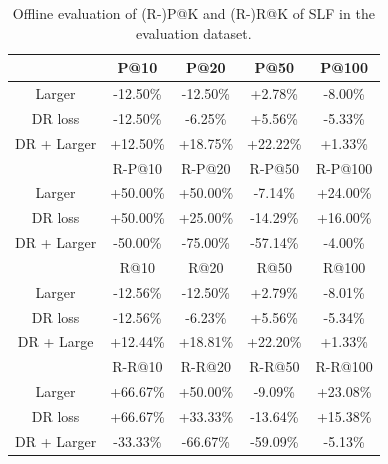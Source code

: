 \documentclass[sigconf, authorversion]{acmart}
\begin{document}
\begin{table}[h]
  \caption{Offline evaluation of (R-)P@K and (R-)R@K of SLF in the evaluation dataset.}
  \label{tab:offline_eval_TPLF}
  \begin{tabular}{ccccc}
    \toprule
    & P@10 & P@20 & P@50 & P@100  \\
    \hline
    Larger      & -12.50\% & -12.50\% & +2.78\%  & -8.00\% \\
    DR loss   & -12.50\%   & -6.25\%    & +5.56\%    & -5.33\%     \\
    DR + Larger      & +12.50\% & +18.75\% & +22.22\% & +1.33\% \\
    \hline \hline
    & R-P@10 & R-P@20 & R-P@50 & R-P@100  \\
    \hline
    Larger      & +50.00\% & +50.00\%  & -7.14\%  & +24.00\% \\
    DR loss   & +50.00\%   & +25.00\%   & -14.29\%   & +16.00\%    \\
    DR + Larger      & -50.00\% & -75.00\%  & -57.14\% & -4.00\% \\
    \hline \hline
    & R@10 & R@20 & R@50 & R@100  \\
    \hline
    Larger   & -12.56\%    & -12.50\%   & +2.79\%     & -8.01\%     \\
    DR loss   & -12.56\%    & -6.23\%    & +5.56\%     & -5.34\%     \\
    DR + Large& +12.44\%    & +18.81\%   & +22.20\%    & +1.33\%     \\
    & R-R@10 & R-R@20 & R-R@50 & R-R@100  \\
    \hline
    Larger      & +66.67\% & +50.00\% & -9.09\% & +23.08\% \\
    DR loss   & +66.67\%    & +33.33\%     & -13.64\%     & +15.38\%    \\
    DR + Larger      & -33.33\% & -66.67\% & -59.09\% & -5.13\% \\
    \bottomrule
  \end{tabular}
\end{table}
\end{document}
